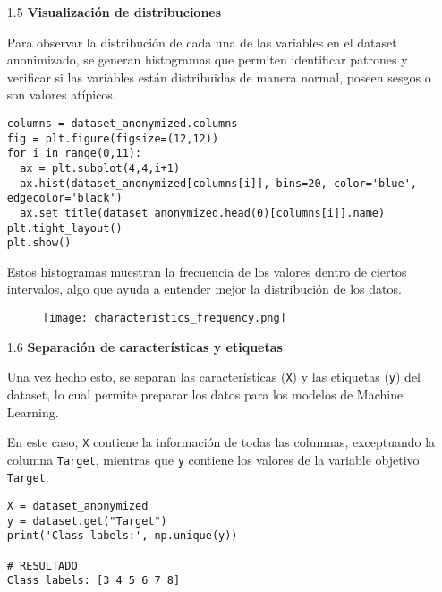 \documentclass{article}
\begin{document}
\newpage

\begin{itemize}

\item[1.5]  {\bf Visualizaci\'on de distribuciones}

Para observar la distribuci\'on de cada una de las variables en el dataset anonimizado, se generan histogramas que permiten identificar patrones y verificar si las variables est\'an distribuidas de manera normal, poseen sesgos o son valores at\'ipicos.

\begin{tcolorbox}[width=14cm]
\begin{scriptsize}
\begin{verbatim}
columns = dataset_anonymized.columns
fig = plt.figure(figsize=(12,12))
for i in range(0,11):
  ax = plt.subplot(4,4,i+1)
  ax.hist(dataset_anonymized[columns[i]], bins=20, color='blue', edgecolor='black')
  ax.set_title(dataset_anonymized.head(0)[columns[i]].name)
plt.tight_layout()
plt.show()
\end{verbatim}
\end{scriptsize}
\end{tcolorbox}

Estos histogramas muestran la frecuencia de los valores dentro de ciertos intervalos, algo que ayuda a entender mejor la distribuci\'on de los datos.

\begin{figure}[h]
  \centering
  \texttt{[image: characteristics\_frequency.png]}
\end{figure}

\end{itemize}

\newpage

\begin{itemize}

\item[1.6]  {\bf Separaci\'on de caracter\'isticas y etiquetas}

Una vez hecho esto, se separan las caracter\'isticas (\texttt{X}) y las etiquetas (\texttt{y}) del dataset, lo cual permite preparar los datos para los modelos de Machine Learning.

En este caso, \texttt{X} contiene la informaci\'on de todas las columnas, exceptuando la columna \texttt{Target}, mientras que \texttt{y} contiene los valores de la variable objetivo \texttt{Target}.

\begin{tcolorbox}[width=14cm]
\begin{scriptsize}
\begin{verbatim}
X = dataset_anonymized
y = dataset.get("Target")
print('Class labels:', np.unique(y))

# RESULTADO
Class labels: [3 4 5 6 7 8]
\end{verbatim}
\end{scriptsize}
\end{tcolorbox}

\end{itemize}
\end{document}
